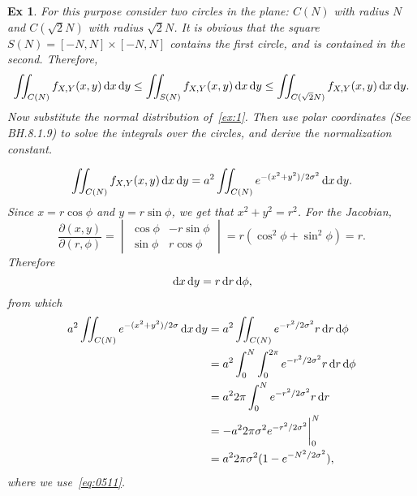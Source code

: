\documentclass[a4paper,11pt]{article}
\newtheorem{exercise}[theorem]{Ex}
\begin{document}
\begin{exercise}
For this purpose consider two circles in the plane: $C(N)$ with radius $N$ and $C(\sqrt 2 N)$ with radius $\sqrt 2 N$.
It is obvious that the square $S(N) = [-N,N]\times[-N,N]$ contains the first circle, and is contained in the second.
Therefore,
\begin{equation}
  \label{eq:0513}
  \iint_{C(N)}f_{X,Y}(x,y) \,\textrm{d}x\,\textrm{d}y \leq
  \iint_{S(N)}f_{X,Y}(x,y) \,\textrm{d}x\,\textrm{d}y \leq
  \iint_{C(\sqrt 2 N)}f_{X,Y}(x,y) \,\textrm{d}x\,\textrm{d}y.
\end{equation}
Now substitute the normal distribution of~\cref{ex:1}.
Then use polar coordinates (See BH.8.1.9) to solve the integrals over the circles, and derive the normalization constant.
\begin{solution}
\begin{equation}
\label{eq:0514}
  \iint_{C(N)}f_{X,Y}(x,y) \,\textrm{d}x\,\textrm{d}y =
a^{2}  \iint_{C(N)} e^{-(x^{2}+y^{2})/2\sigma^2} \,\textrm{d}x\,\textrm{d}y.
\end{equation}
Since  $x = r \cos \phi$ and $y=r\sin \phi$, we get that $x^2+y^2 = r^{2}$. For the Jacobian,
\begin{equation}
  \label{eq:0515}
  \frac{\partial(x, y)}{\partial(r,\phi)} =
  \begin{vmatrix}
    \cos \phi  & -r\sin \phi \\
    \sin \phi  & r\cos \phi
  \end{vmatrix}
= r(\cos^{2} \phi + \sin^2 \phi) = r.
\end{equation}
Therefore
\begin{equation}
\label{eq:0516}
\,\textrm{d}x \,\textrm{d}y = r \,\textrm{d}r \,\textrm{d}\phi,
\end{equation}
from which
\begin{align}
a^{2}  \iint_{C(N)} e^{-(x^{2}+y^{2})/2\sigma} \,\textrm{d}x\,\textrm{d}y
&=a^{2}  \iint_{C(N)} e^{-r^{2}/2\sigma^{2}} r \,\textrm{d}r\,\textrm{d}\phi \\
&= a^{2}  \int_{0}^{N} \int_{0}^{2\pi} e^{-r^{2}/2\sigma^{2}} r \,\textrm{d}r\,\textrm{d}\phi \\
&= a^{2}  2\pi \int_{0}^{N}  e^{-r^{2}/2\sigma^{2}} r \,\textrm{d}r \\
&= - a^{2}  2\pi{\sigma^{2}} e^{-r^{2}/2\sigma^{2}}\biggr|_{0}^{N} \\
&= a^{2}2\pi{\sigma^{2}} (1-e^{-N^{2}/2\sigma^{2}}),
\end{align}
where we use~\cref{eq:0511}.



\end{solution}
\end{exercise}
\end{document}
